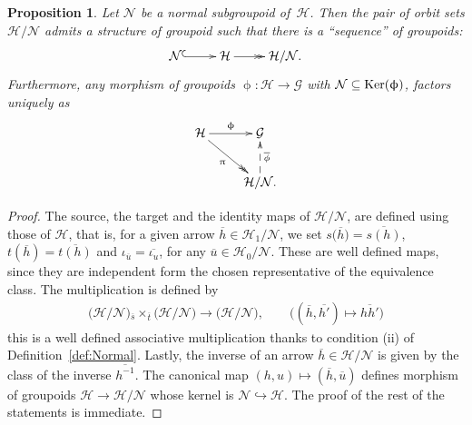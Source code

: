 \documentclass[pdftex]{sigma}
\numberwithin{equation}{section}
\newtheorem{Proposition}[Theorem]{Proposition}
 { \theoremstyle{definition}
\newtheorem{Definition}[Theorem]{Definition}
\newtheorem{Remark}[Theorem]{Remark}
\newtheorem{Example}[Theorem]{Example}
 }
\newcommand{\bara}[1]{\overline{#1}}
\newcommand{\Ho}{\cH_{\Sscript{0}}}
\newcommand{\Ker}[1]{{\rm Ker}(#1)}
\newcommand{\cG}{{\mathcal G}}
\newcommand{\cH}{{\mathcal H}}
\newcommand{\cN}{{\mathcal N}}
\newcommand{\Sscript}[1]{\scriptscriptstyle{#1}}
\newcommand{\due}[3]{{}_{{#2 }} {#1}_{{ #3}} }
\begin{document}
\begin{Proposition}\label{prop:quotient}Let $\cN$ be a normal subgroupoid of~$\cH$. Then the pair of orbit sets $\cH/\cN$ admits a structure of groupoid such that there is a ``sequence'' of groupoids:
\begin{gather*}
\xymatrix{\cN \ar@{^{(}->}[r] & \cH \ar@{->>}[r] & \cH/\cN.}
\end{gather*}
Furthermore, any morphism of groupoids $\upphi\colon \cH \to \cG$ with $\cN \subseteq \Ker{\upphi} $, factors uniquely as
\begin{gather*}
\xymatrix{ \cH \ar@{->}^-{\upphi}[r] \ar@{->>}_-{\uppi}[rd] & \cG
\\ & \cH/\cN. \ar@{-->}_-{\bara{\phi}}[u]. }
\end{gather*}
\end{Proposition}
\begin{proof}The source, the target and the identity maps of $\cH/\cN$, are defined using those of $\cH$, that is, for a given arrow $\bara{h} \in \cH_{\Sscript{1}}/\cN$, we set $s\big(\bara{h}\big)=\bara{s(h)}$, $t(\bara{h})=\bara{t(h)}$ and $\iota_{\bara {\Sscript{u}}}=\bara{\iota_{\Sscript{u}}}$, for any $\bara{u} \in \Ho/\cN$. These are well defined maps, since they are independent form the chosen representative of the equivalence class. The multiplication is defined by
\begin{gather*}
\big(\cH/\cN\big) \due \times { \Sscript{\bara{s}}} {\Sscript{\bara{t}}} \big(\cH/\cN\big) \longrightarrow\big(\cH/\cN\big), \qquad \big( (\bara{h}, \bara{h'}) \longmapsto \bara{hh'} \big)
\end{gather*}
this is a well defined associative multiplication thanks to condition (ii) of Definition~\ref{def:Normal}. Lastly, the inverse of an arrow $\bara{h} \in \cH/\cN$ is given by the class of the inverse $\bara{h^{-1}}$. The canonical map $(h,u) \mapsto (\bara{h}, \bara{u})$ defines morphism of groupoids $\cH \to \cH/\cN$ whose kernel is $\cN \hookrightarrow \cH$. The proof of the rest of the statements is immediate.
\end{proof}
\end{document}
